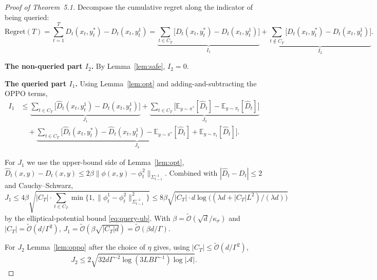 \documentclass[11pt]{article}
\newcommand{\Otilde}{\tilde{\mathcal{O}}}
\newcommand{\E}{\mathbb{E}}
\begin{document}
\begin{proof}[Proof of Theorem~5.1]
Decompose the cumulative regret along the indicator of being queried:
\begin{equation}
  \mathrm{Regret}(T)
  = \sum_{t=1}^T D_t(x_t, y_t^*) - D_t(x_t, y_t^1)
  = \underbrace{\sum_{t \in C_T} \bigl[D_t(x_t, y_t^*) - D_t(x_t, y_t^1)\bigr]}_{I_1}
  + \underbrace{\sum_{t \notin C_T} \bigl[D_t(x_t, y_t^*) - D_t(x_t, y_t^1)\bigr]}_{I_2}.
  \label{eq:I1I2}
\end{equation}

\textbf{The non-queried part $I_2$.} By Lemma~\ref{lem:safe}, $I_2 = 0$.

\textbf{The queried part $I_1$.} Using Lemma~\ref{lem:opt} and adding-and-subtracting the OPPO terms,
\begin{equation}
\begin{aligned}
  I_1
  &\le \underbrace{\sum_{t \in C_T} \bigl[\hat D_t(x_t, y_t^1) - D_t(x_t, y_t^1)\bigr]}_{J_1}
  + \underbrace{\sum_{t \in C_T} \bigl[\E_{y \sim \pi^*}[\hat D_t] - \E_{y \sim \pi_t}[\hat D_t]\bigr]}_{J_2} \\
  &\quad
  + \underbrace{\sum_{t \in C_T} \bigl[\hat D_t(x_t, y_t^*) - \hat D_t(x_t, y_t^1) - \E_{y \sim \pi^*}[\hat D_t] + \E_{y \sim \pi_t}[\hat D_t]\bigr]}_{J_3}.
\end{aligned}
\label{eq:J123}
\end{equation}

For $J_1$ we use the upper-bound side of Lemma~\ref{lem:opt}, $\hat D_t(x, y) - D_t(x, y) \le 2\beta\|\phi(x,y) - \phi_t^2\|_{\Sigma_{t-1}^{-1}}$. Combined with $|\hat D_t - D_t| \le 2$ and Cauchy--Schwarz,
\begin{equation}
  J_1 \le 4 \beta \sqrt{|C_T| \cdot \sum_{t \in C_T} \min\{1, \|\phi_t^1 - \phi_t^2\|_{\Sigma_{t-1}^{-1}}^2\}}
  \le 8 \beta \sqrt{|C_T| \cdot d \log\bigl((\lambda d + |C_T| L^2)/(\lambda d)\bigr)}
  \label{eq:J1-bound}
\end{equation}
by the elliptical-potential bound \eqref{eq:query-ub}. With $\beta = \Otilde(\sqrt{d}/\kappa_\sigma)$ and $|C_T| = \Otilde(d/\Gamma^2)$,
$J_1 = \Otilde(\beta \sqrt{|C_T| d}) = \Otilde(\beta d / \Gamma)$.

For $J_2$ Lemma~\ref{lem:oppo} after the choice of $\eta$ gives, using $|C_T| \le \Otilde(d / \Gamma^2)$,
\begin{equation}
  J_2 \le 2 \sqrt{32 d \Gamma^{-2} \log(3 L B \Gamma^{-1}) \log|\mathcal{A}|}.
  \label{eq:J2-bound}
\end{equation}


\end{proof}
\end{document}
